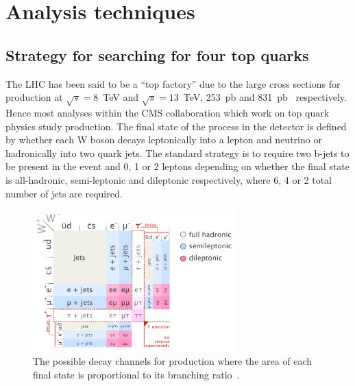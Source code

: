 \chapter{Analysis techniques \label{c:ana}}
\section{Strategy for searching for four top quarks \label{sec:Strategy}}

The LHC has been said to be a ``top factory'' due to the large cross sections for \ttbar production at $\sqrt{s}=8$~TeV and $\sqrt{s}=13$~TeV, 253~pb and 831~pb~\cite{PhysRevLett.110.252004,Czakon20142930} respectively. Hence most analyses within the CMS collaboration which work on top quark physics study \ttbar production. 
The final state of the \ttbar process in the detector is defined by whether each W boson decays leptonically into a lepton and neutrino or hadronically into two quark jets. The standard strategy is to require two b-jets to be present in the event and 0, 1 or 2 leptons depending on whether the final state is all-hadronic, semi-leptonic and dileptonic respectively, where 6, 4 or 2 total number of jets are required. 

\begin{figure}[ht!]
\centering
    \includegraphics[width=0.7\textwidth]{images/Analysis/Ttbar_decay_channels.png}
    \caption{The possible decay channels for \ttbar production where the area of each final state is proportional to its branching ratio~\cite{tt_decay_channels:NBartosik }.}
    \label{fig:ttbarDecay}
\end{figure}

